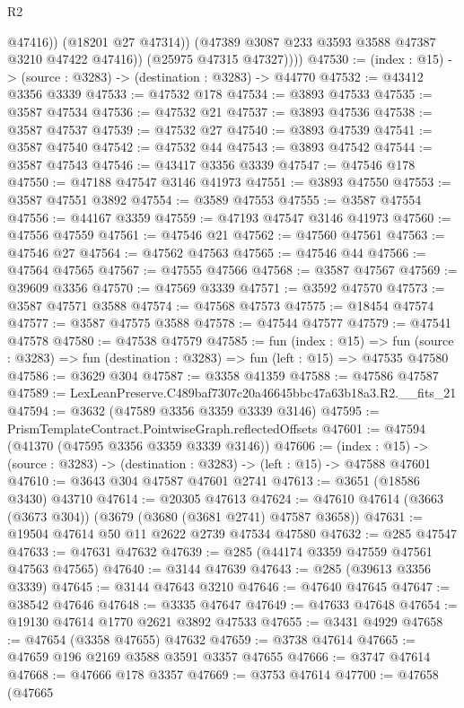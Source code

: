\begin{lexlean}{R2}
\begin{coremodule}
                  @47416))
              (@18201 @27 @47314))
            (@47389 @3087 @233 @3593 @3588 @47387 @3210 @47422 @47416))
          (@25975 @47315 @47327))))
@47530 := (index : @15) -> (source : @3283) -> (destination : @3283) -> @44770
@47532 := @43412 @3356 @3339
@47533 := @47532 @178
@47534 := @3893 @47533
@47535 := @3587 @47534
@47536 := @47532 @21
@47537 := @3893 @47536
@47538 := @3587 @47537
@47539 := @47532 @27
@47540 := @3893 @47539
@47541 := @3587 @47540
@47542 := @47532 @44
@47543 := @3893 @47542
@47544 := @3587 @47543
@47546 := @43417 @3356 @3339
@47547 := @47546 @178
@47550 := @47188 @47547 @3146 @41973
@47551 := @3893 @47550
@47553 := @3587 @47551 @3892
@47554 := @3589 @47553
@47555 := @3587 @47554
@47556 := @44167 @3359
@47559 := @47193 @47547 @3146 @41973
@47560 := @47556 @47559
@47561 := @47546 @21
@47562 := @47560 @47561
@47563 := @47546 @27
@47564 := @47562 @47563
@47565 := @47546 @44
@47566 := @47564 @47565
@47567 := @47555 @47566
@47568 := @3587 @47567
@47569 := @39609 @3356
@47570 := @47569 @3339
@47571 := @3592 @47570
@47573 := @3587 @47571 @3588
@47574 := @47568 @47573
@47575 := @18454 @47574
@47577 := @3587 @47575 @3588
@47578 := @47544 @47577
@47579 := @47541 @47578
@47580 := @47538 @47579
@47585 := fun (index : @15) =>
  fun (source : @3283) => fun (destination : @3283) => fun (left : @15) => @47535 @47580
@47586 := @3629 @304
@47587 := @3358 @41359
@47588 := @47586 @47587
@47589 := LexLeanPreserve.C489baf7307c20a46645bbc47a63b18a3.R2.__fits_21
@47594 := @3632 (@47589 @3356 @3359 @3339 @3146)
@47595 := PrismTemplateContract.PointwiseGraph.reflectedOffsets
@47601 := @47594 (@41370 (@47595 @3356 @3359 @3339 @3146))
@47606 := (index : @15) ->
  (source : @3283) -> (destination : @3283) -> (left : @15) -> @47588 @47601
@47610 := @3643 @304 @47587 @47601 @2741
@47613 := @3651 (@18586 @3430) @43710
@47614 := @20305 @47613
@47624 := @47610 @47614 (@3663 (@3673 @304)) (@3679 (@3680 (@3681 @2741) @47587 @3658))
@47631 := @19504 @47614 @50 @11 @2622 @2739 @47534 @47580
@47632 := @285 @47547
@47633 := @47631 @47632
@47639 := @285 (@44174 @3359 @47559 @47561 @47563 @47565)
@47640 := @3144 @47639
@47643 := @285 (@39613 @3356 @3339)
@47645 := @3144 @47643 @3210
@47646 := @47640 @47645
@47647 := @38542 @47646
@47648 := @3335 @47647
@47649 := @47633 @47648
@47654 := @19130 @47614 @1770 @2621 @3892 @47533
@47655 := @3431 @4929
@47658 := @47654 (@3358 @47655) @47632
@47659 := @3738 @47614
@47665 := @47659 @196 @2169 @3588 @3591 @3357 @47655
@47666 := @3747 @47614
@47668 := @47666 @178 @3357
@47669 := @3753 @47614
@47700 := @47658
    (@47665

\end{coremodule}
\end{lexlean}

